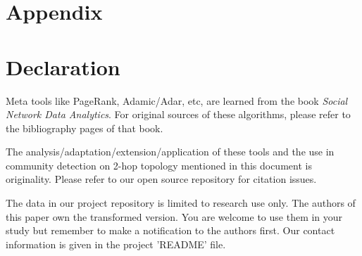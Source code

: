 \documentclass[11pt,a4paper]{article}
\begin{document}


\section*{Appendix}


\section*{Declaration}

Meta tools like PageRank, Adamic/Adar, etc, are learned from the book
\textit{Social Network Data Analytics}. For original sources of these 
algorithms, please refer to the bibliography pages of that book.

The analysis/adaptation/extension/application of these tools and 
the use in community detection on 2-hop topology mentioned 
in this document is originality. Please refer to our open source 
repository for citation issues.

The data in our project repository is limited to research use only. 
The authors of this paper own the transformed version. You are welcome
to use them in your study but remember to make a notification to the 
authors first. Our contact information is given in the project 'README' file. 
\end{document}
